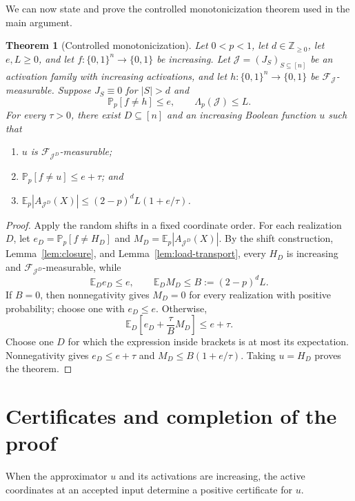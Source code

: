 \documentclass[11pt,letterpaper]{article}
\newtheorem{theorem}{Theorem}[section]
\theoremstyle{definition}
\theoremstyle{remark}
\newcommand{\bits}{\{0,1\}}
\newcommand{\E}{\mathbb E}
\renewcommand{\Pr}{\mathbb P}
\newcommand{\cF}{\mathcal F}
\newcommand{\cJ}{\mathcal J}
\begin{document}
We can now state and prove the controlled monotonicization theorem used in the
main argument.

\begin{theorem}[Controlled monotonicization]
\label{thm:controlled-monotonicization}
Let $0<p<1$, let $d\in\mathbb Z_{\ge0}$, let $e,L\ge0$, and let
$f:\bits^n\to\bits$ be increasing.  Let
$\cJ=(J_S)_{S\subseteq[n]}$ be an activation family with increasing
activations, and let $h:\bits^n\to\bits$ be $\cF_{\cJ}$-measurable.  Suppose
$J_S\equiv0$ for $|S|>d$ and
\[
       \Pr_p[f\ne h]\le e,
       \qquad
       \Lambda_p(\cJ)\le L.
\]
For every $\tau>0$, there exist $D\subseteq[n]$ and an increasing Boolean
function $u$ such that
\begin{enumerate}[label=\textup{(\roman*)}]
\item $u$ is $\cF_{\cJ^D}$-measurable;
\item $\Pr_p[f\ne u]\le e+\tau$; and
\item $\E_p|A_{\cJ^D}(X)|\le(2-p)^d L(1+e/\tau)$.
\end{enumerate}
\end{theorem}

\begin{proof}
Apply the random shifts in a fixed coordinate order.  For each realization $D$, let
$e_D=\Pr_p[f\ne H_D]$ and $M_D=\E_p|A_{\cJ^D}(X)|$.
By the shift construction, Lemma~\ref{lem:closure}, and
Lemma~\ref{lem:load-transport}, every $H_D$ is increasing and
$\cF_{\cJ^D}$-measurable, while
\[
       \E_D e_D\le e,
       \qquad
       \E_D M_D\le B:=(2-p)^d L.
\]
If $B=0$, then nonnegativity gives $M_D=0$ for every realization with
positive probability; choose one with $e_D\le e$.  Otherwise,
\[
       \E_D\left[e_D+\frac{\tau}{B}M_D\right]\le e+\tau.
\]
Choose one $D$ for which the expression inside brackets is at most its
expectation.  Nonnegativity gives
$e_D\le e+\tau$ and
$M_D\le B(1+e/\tau)$.  Taking $u=H_D$ proves the theorem.
\end{proof}

\section{Certificates and completion of the proof}
\label{sec:certificates}

When the approximator $u$ and its activations are increasing, the active
coordinates at an accepted input determine a positive certificate for $u$.
\end{document}
